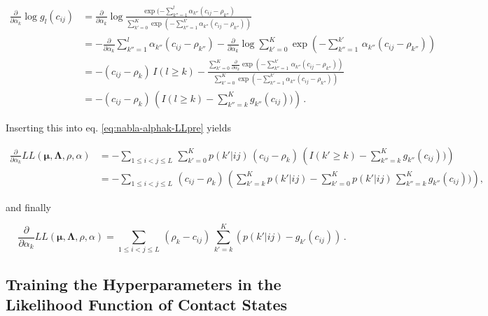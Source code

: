 \documentclass[11pt,a4paper,twoside]{book}
\newcommand{\cij}{c_{ij}}
\theoremstyle{definition}
\theoremstyle{definition}
\theoremstyle{remark}
\begin{document}
\begin{align}
    \frac{\partial} {\partial \alpha_k}  \log g_{l}(\cij)  
    &= \frac{\partial} {\partial \alpha_k}  \log  \frac{\exp (- \sum_{k''=1}^{l} \alpha_{k''} (\cij - \rho_{k''} ) }{ \sum_{k'=0}^K  \exp (- \sum_{k''=1}^{k'} \alpha_{k''} (\cij - \rho_{k''} ) ) } \nonumber \\
    &= -  \frac{\partial} {\partial \alpha_k}  \sum_{k''=1}^{l} \alpha_{k''} (\cij - \rho_{k''} )  
        - \frac{\partial} {\partial \alpha_k}  \log  \sum_{k'=0}^K  \exp \left(- \sum_{k''=1}^{k'} \, \alpha_{k''} (\cij - \rho_{k''} ) \right)  \nonumber \\
    &= - (\cij - \rho_{k} ) \, I(l \ge k) -  \frac{ \sum_{k'=0}^K \frac{\partial} {\partial \alpha_k}  \exp (- \sum_{k''=1}^{k'} \, \alpha_{k''} (\cij - \rho_{k''} ) ) }{ \sum_{k'=0}^K  \exp (- \sum_{k''=1}^{k'} \alpha_{k''} (\cij - \rho_{k''} ) ) } \nonumber \\
    &= - (\cij - \rho_{k} )  \, \left(  I(l \ge k)  -  \sum_{k''=k}^K  g_{k''}(\cij) )  \right)  \, .
    \label{eq:dlog-gk-dalpha}
\end{align}

Inserting this into eq. \eqref{eq:nabla-alphak-LLpre} yields

\begin{align}
    \frac{\partial} {\partial \alpha_k}  L\!L(\mathbf{\mu}, \mathbf{\Lambda}, \rho, \alpha) 
    &= - \sum_{1\le i<j\le L}  \, \sum_{k'=0}^K  p(k'|ij) \, (\cij - \rho_k) \, \left(  I(k' \ge k)  -  \sum_{k''=k}^K  g_{k''}(\cij) )  \right)  \nonumber \\
    &= -\sum_{1\le i<j\le L}  \, (\cij - \rho_k) \, \left( \sum_{k'=k}^K  p(k'|ij)   -  \sum _{k'=0}^K  p(k'|ij) \, \sum_{k''=k}^K  g_{k''}(\cij) )  \right) ,
\end{align}

and finally

\begin{equation}
    \frac{\partial} {\partial \alpha_k}  L\!L(\mathbf{\mu}, \mathbf{\Lambda}, \rho, \alpha)     = \sum_{1\le i<j\le L}  \, (\rho_k - \cij) \, \sum_{k'=k}^K  ( p(k'|ij) -  g_{k'}(\cij) )  \, .
\end{equation}

\subsection{Training the Hyperparameters in the Likelihood Function of
Contact States}\label{training-hyperparameters-bayesian-model}
\end{document}
